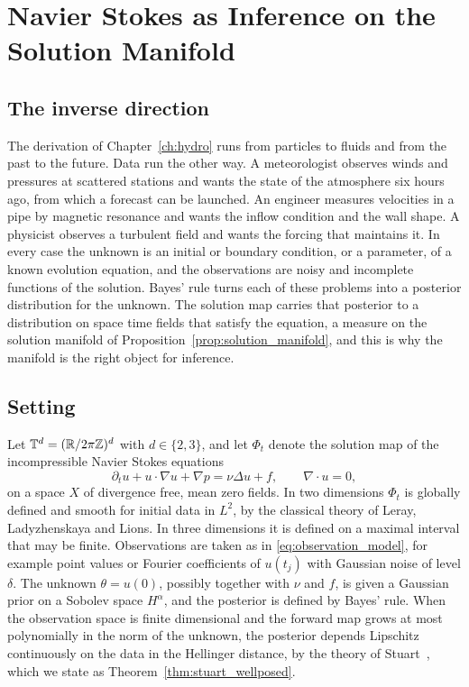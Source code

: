 \chapter{Navier Stokes as Inference on the Solution Manifold}
\label{ch:nsinference}

\section{The inverse direction}

The derivation of Chapter~\ref{ch:hydro} runs from particles to fluids and from the past to the future. Data run the other way. A meteorologist observes winds and pressures at scattered stations and wants the state of the atmosphere six hours ago, from which a forecast can be launched. An engineer measures velocities in a pipe by magnetic resonance and wants the inflow condition and the wall shape. A physicist observes a turbulent field and wants the forcing that maintains it. In every case the unknown is an initial or boundary condition, or a parameter, of a known evolution equation, and the observations are noisy and incomplete functions of the solution. Bayes' rule turns each of these problems into a posterior distribution for the unknown. The solution map carries that posterior to a distribution on space time fields that satisfy the equation, a measure on the solution manifold of Proposition~\ref{prop:solution_manifold}, and this is why the manifold is the right object for inference.

\section{Setting}

Let $\mathbb{T}^d = (\mathbb{R}/2\pi\mathbb{Z})^d$ with $d\in\{2,3\}$, and let $\Phi_t$ denote the solution map of the incompressible Navier Stokes equations
\[
\partial_tu+u\cdot\nabla u+\nabla p = \nu\Delta u+f,\qquad\nabla\cdot u = 0,
\]
on a space $X$ of divergence free, mean zero fields. In two dimensions $\Phi_t$ is globally defined and smooth for initial data in $L^2$, by the classical theory of Leray, Ladyzhenskaya and Lions. In three dimensions it is defined on a maximal interval that may be finite. Observations are taken as in \eqref{eq:observation_model}, for example point values or Fourier coefficients of $u(t_j)$ with Gaussian noise of level $\delta$. The unknown $\theta = u(0)$, possibly together with $\nu$ and $f$, is given a Gaussian prior on a Sobolev space $H^\alpha$, and the posterior is defined by Bayes' rule. When the observation space is finite dimensional and the forward map grows at most polynomially in the norm of the unknown, the posterior depends Lipschitz continuously on the data in the Hellinger distance, by the theory of Stuart~\cite{stuart2010}, which we state as Theorem~\ref{thm:stuart_wellposed}.

